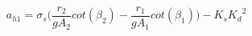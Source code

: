\begin{equation}
  a_{h1} = \sigma_s 
  \bigg(\frac{r_2}{gA_2}cot(\beta_2)-\frac{r_1}{gA_1}cot(\beta_1)\bigg)-K_s{K_d}^2
\end{equation}



 
%
%
%
%
%
%





